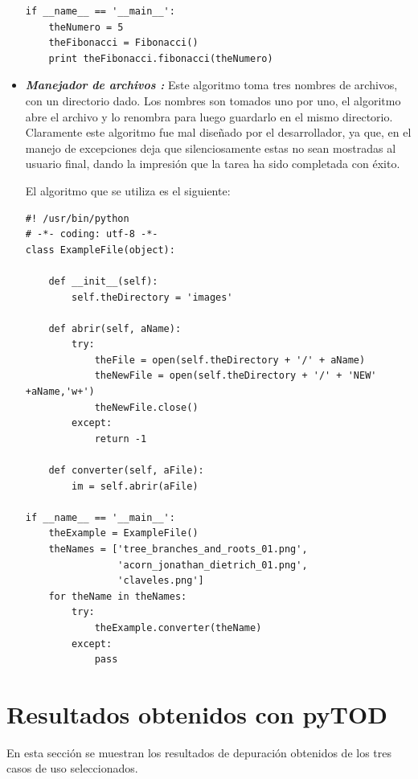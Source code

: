\documentclass[12pt,legalpaper]{report}
\begin{document}
\begin{itemize}
\begin{singlespace}
\begin{lstlisting}[style=Python]
if __name__ == '__main__':   
    theNumero = 5
    theFibonacci = Fibonacci()
    print theFibonacci.fibonacci(theNumero)
\end{lstlisting}
\end{singlespace}	
	
	\item \textit{\textbf{Manejador de archivos :}} Este algoritmo toma tres nombres de archivos, con un directorio dado.  Los nombres son tomados uno por uno, el algoritmo abre el archivo y lo renombra para luego guardarlo en el mismo directorio.  Claramente este algoritmo fue mal diseñado por el desarrollador, ya que, en el manejo de excepciones deja que silenciosamente estas no sean mostradas al usuario final, dando la impresión que la tarea ha sido completada con éxito.

	El algoritmo que se utiliza es el siguiente:
	
\begin{singlespace}
\begin{lstlisting}[style=Python]
#! /usr/bin/python
# -*- coding: utf-8 -*-
class ExampleFile(object):
    
    def __init__(self):
        self.theDirectory = 'images'
    
    def abrir(self, aName):
        try:
            theFile = open(self.theDirectory + '/' + aName)
            theNewFile = open(self.theDirectory + '/' + 'NEW' +aName,'w+')
            theNewFile.close()
        except:
            return -1
    
    def converter(self, aFile):
        im = self.abrir(aFile)
        
if __name__ == '__main__':
    theExample = ExampleFile()
    theNames = ['tree_branches_and_roots_01.png',
                'acorn_jonathan_dietrich_01.png',
                'claveles.png']
    for theName in theNames:
        try:
            theExample.converter(theName)
        except:
            pass
\end{lstlisting}
\end{singlespace}	
	
	
\end{itemize}	
	
	\section{Resultados obtenidos con pyTOD}

En esta sección se muestran los resultados de depuración obtenidos de los tres casos de uso seleccionados.
\end{document}
